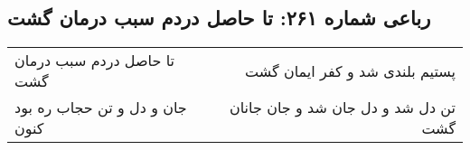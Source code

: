 \begin{center}
\section*{رباعی شماره ۲۶۱: تا حاصل دردم سبب درمان گشت}
\label{sec:0261}
\begin{longtable}{l p{0.5cm} r}
تا حاصل دردم سبب درمان گشت
&&
پستیم بلندی شد و کفر ایمان گشت
\\
جان و دل و تن حجاب ره بود کنون
&&
تن دل شد و دل جان شد و جان جانان گشت
\\
\end{longtable}
\end{center}
